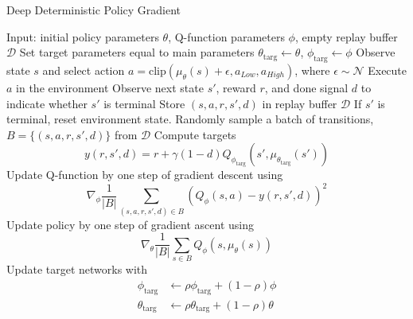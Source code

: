 \documentclass[conference]{IEEEtran}
\begin{document}
\begin{algorithm}[H]
    \caption{Deep Deterministic Policy Gradient}
    \label{alg1}
\begin{algorithmic}[1]
    \STATE Input: initial policy parameters $\theta$, Q-function parameters $\phi$, empty replay buffer $\mathcal{D}$
    \STATE Set target parameters equal to main parameters $\theta_{\text{targ}} \leftarrow \theta$, $\phi_{\text{targ}} \leftarrow \phi$
    \REPEAT
        \STATE Observe state $s$ and select action $a = \text{clip}(\mu_{\theta}(s) + \epsilon, a_{Low}, a_{High})$, where $\epsilon \sim \mathcal{N}$
        \STATE Execute $a$ in the environment
        \STATE Observe next state $s'$, reward $r$, and done signal $d$ to indicate whether $s'$ is terminal
        \STATE Store $(s,a,r,s',d)$ in replay buffer $\mathcal{D}$
        \STATE If $s'$ is terminal, reset environment state.
                \STATE Randomly sample a batch of transitions, $B = \{ (s,a,r,s',d) \}$ from $\mathcal{D}$
                \STATE Compute targets
                \begin{equation*}
                    y(r,s',d) = r + \gamma (1-d) Q_{\phi_{\text{targ}}}(s', \mu_{\theta_{\text{targ}}}(s'))
                \end{equation*}
                \STATE Update Q-function by one step of gradient descent using
                \begin{equation*}
                    \nabla_{\phi} \frac{1}{|B|}\sum_{(s,a,r,s',d) \in B} \left( Q_{\phi}(s,a) - y(r,s',d) \right)^2
                \end{equation*}
                \STATE Update policy by one step of gradient ascent using
                \begin{equation*}
                    \nabla_{\theta} \frac{1}{|B|}\sum_{s \in B}Q_{\phi}(s, \mu_{\theta}(s))
                \end{equation*}
                \STATE Update target networks with
                \begin{align*}
                    \phi_{\text{targ}} &\leftarrow \rho \phi_{\text{targ}} + (1-\rho) \phi \\
                    \theta_{\text{targ}} &\leftarrow \rho \theta_{\text{targ}} + (1-\rho) \theta
                \end{align*}
            \ENDFOR
        \ENDIF
\end{algorithmic}
\end{algorithm}
\end{document}
